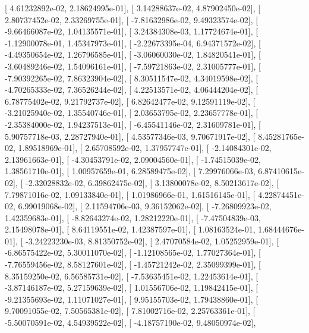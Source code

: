 \documentclass{article}
\begin{document}
       [  4.61232892e-02,   2.18624995e-01],
       [  3.14288637e-02,   4.87902450e-02],
       [  2.80737452e-02,   2.33269755e-01],
       [ -7.81632986e-02,   9.49323574e-02],
       [ -9.66466087e-02,   1.04135571e-01],
       [  3.24384308e-03,   1.17724674e-01],
       [ -1.12900078e-01,   1.45347973e-01],
       [ -2.22673395e-04,   6.94371572e-02],
       [ -4.49350654e-02,   1.26796585e-01],
       [ -3.06060030e-02,   1.84820541e-01],
       [ -3.60489246e-02,   1.54096161e-01],
       [ -7.59721863e-02,   2.31005777e-01],
       [ -7.90392265e-02,   7.86323904e-02],
       [  8.30511547e-02,   4.34019598e-02],
       [ -4.70265333e-02,   7.36526244e-02],
       [  4.22513571e-02,   4.06444204e-02],
       [  6.78775402e-02,   9.21792737e-02],
       [  6.82642477e-02,   9.12591119e-02],
       [ -3.21025940e-02,   1.35540746e-01],
       [  2.03653795e-02,   2.23657778e-01],
       [ -2.35384000e-02,   1.94237513e-01],
       [ -6.45541146e-02,   2.31609781e-01],
       [  5.90757718e-03,   2.28727940e-01],
       [  4.53577346e-03,   9.70671917e-02],
       [  8.45281765e-02,   1.89518969e-01],
       [  2.65708592e-02,   1.37957747e-01],
       [ -2.14084301e-02,   2.13961663e-01],
       [ -4.30453791e-02,   2.09004560e-01],
       [ -1.74515039e-02,   1.38561710e-01],
       [  1.00957659e-01,   6.28589475e-02],
       [  7.29976066e-03,   6.87410615e-02],
       [ -2.32028832e-02,   6.39862475e-02],
       [  3.13800078e-02,   8.50213617e-02],
       [  7.79871016e-02,   1.09133840e-01],
       [  1.01986966e-01,   1.61516145e-01],
       [  4.22874451e-02,   6.99019068e-02],
       [  2.11594706e-03,   9.36152062e-02],
       [ -7.26809923e-02,   1.42359683e-01],
       [ -8.82643274e-02,   1.28212220e-01],
       [ -7.47504839e-03,   2.15498078e-01],
       [  8.64119551e-02,   1.42387597e-01],
       [  1.08163524e-01,   1.68444676e-01],
       [ -3.24223230e-03,   8.81350752e-02],
       [  2.47070584e-02,   1.05252959e-01],
       [ -6.86575422e-02,   5.30011070e-02],
       [ -1.12108565e-02,   1.77027364e-01],
       [ -7.76559456e-02,   8.58127601e-02],
       [ -1.45721242e-02,   2.35099399e-01],
       [  8.35159250e-02,   6.56585731e-02],
       [ -7.53635451e-02,   1.22453614e-01],
       [ -3.87146187e-02,   5.27159639e-02],
       [  1.01556706e-02,   1.19842415e-01],
       [ -9.21355693e-02,   1.11071027e-01],
       [  9.95155703e-02,   1.79438860e-01],
       [  9.70091055e-02,   7.50565381e-02],
       [  7.81002716e-02,   2.25763361e-01],
       [ -5.50070591e-02,   4.54939522e-02],
       [ -4.18757190e-02,   9.48050974e-02],
\end{document}
